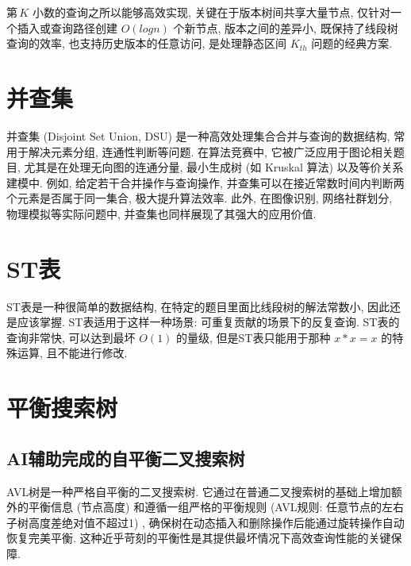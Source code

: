 \documentclass[a4paper]{ctexbook}
\begin{document}
第 $K$ 小数的查询之所以能够高效实现, 关键在于版本树间共享大量节点, 仅针对一个插入或查询路径创建 $O(log n)$ 个新节点, 版本之间的差异小, 既保持了线段树查询的效率, 也支持历史版本的任意访问, 是处理静态区间 $K_{th}$ 问题的经典方案.



\section{并查集}

并查集 (Disjoint Set Union, DSU) 是一种高效处理集合合并与查询的数据结构, 常用于解决元素分组, 连通性判断等问题. 在算法竞赛中, 它被广泛应用于图论相关题目, 尤其是在处理无向图的连通分量, 最小生成树 (如 Kruskal 算法) 以及等价关系建模中. 例如, 给定若干合并操作与查询操作, 并查集可以在接近常数时间内判断两个元素是否属于同一集合, 极大提升算法效率. 此外, 在图像识别, 网络社群划分, 物理模拟等实际问题中, 并查集也同样展现了其强大的应用价值.



\section{ST表}

ST表是一种很简单的数据结构, 在特定的题目里面比线段树的解法常数小, 因此还是应该掌握. ST表适用于这样一种场景: 可重复贡献的场景下的反复查询. ST表的查询非常快, 可以达到最坏 $O(1)$ 的量级, 但是ST表只能用于那种 $x*x=x$ 的特殊运算, 且不能进行修改.



\section{平衡搜索树}

\subsection*{AI辅助完成的自平衡二叉搜索树}

AVL树是一种严格自平衡的二叉搜索树. 它通过在普通二叉搜索树的基础上增加额外的平衡信息 (节点高度) 和遵循一组严格的平衡规则 (AVL规则: 任意节点的左右子树高度差绝对值不超过1) , 确保树在动态插入和删除操作后能通过旋转操作自动恢复完美平衡. 这种近乎苛刻的平衡性是其提供最坏情况下高效查询性能的关键保障.
\end{document}
